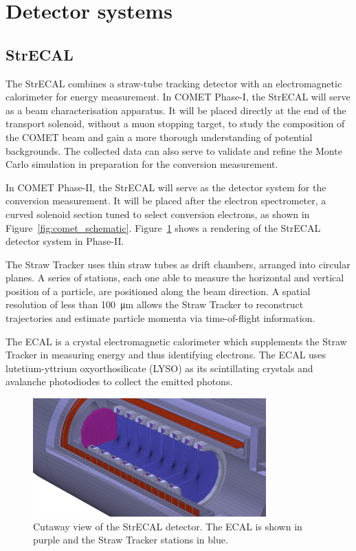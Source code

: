\section{Detector systems}
\subsection{StrECAL}
The StrECAL combines a straw-tube tracking detector with an electromagnetic
calorimeter for energy measurement. In COMET Phase-I, the StrECAL will serve as
a beam characterisation apparatus. It will be placed directly at the end of the
transport solenoid, without a muon stopping target, to study the composition of
the COMET beam and gain a more thorough understanding of potential backgrounds.
The collected data can also serve to validate and refine the Monte Carlo
simulation in preparation for the conversion measurement.

In COMET Phase-II, the StrECAL will serve as the detector system for the
conversion measurement. It will be placed after the electron spectrometer, a
curved solenoid section tuned to select conversion electrons, as shown in
Figure~\ref{fig:comet_schematic}. Figure~\ref{fig:strecal} shows a rendering of
the StrECAL detector system in Phase-II.

The Straw Tracker uses thin straw tubes as drift chambers, arranged into
circular planes. A series of stations, each one able to measure the horizontal
and vertical position of a particle, are positioned along the beam direction. A
spatial resolution of less than \SI{100}{\um} allows the Straw Tracker to
reconstruct trajectories and estimate particle momenta via time-of-flight
information.

The ECAL is a crystal electromagnetic calorimeter which supplements the Straw
Tracker in measuring energy and thus identifying electrons. The ECAL uses
lutetium-yttrium oxyorthosilicate (LYSO) as its scintillating crystals and
avalanche photodiodes to collect the emitted photons.


\begin{figure}
    \centering
    \includegraphics[width=0.8\textwidth]{chapter2/strecal.png}
    \caption{ Cutaway view of the StrECAL detector. The ECAL is shown in
        purple and the Straw Tracker stations in blue. }
    \label{fig:strecal}
\end{figure}

